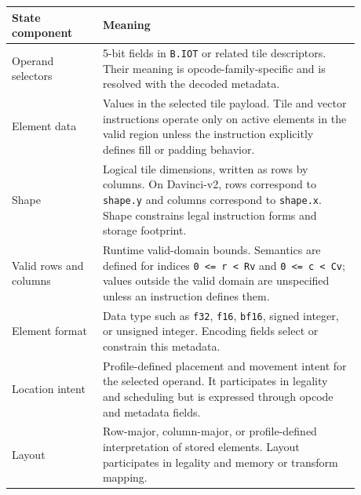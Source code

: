 \begin{longtable}{@{}L{0.23\linewidth}L{0.65\linewidth}@{}}
\toprule
State component & Meaning \\
\midrule
Operand selectors & 5-bit fields in \texttt{B.IOT} or related tile descriptors. Their meaning is opcode-family-specific and is resolved with the decoded metadata. \\
Element data & Values in the selected tile payload. Tile and vector instructions operate only on active elements in the valid region unless the instruction explicitly defines fill or padding behavior. \\
Shape & Logical tile dimensions, written as rows by columns. On Davinci-v2, rows correspond to \texttt{shape.y} and columns correspond to \texttt{shape.x}. Shape constrains legal instruction forms and storage footprint. \\
Valid rows and columns & Runtime valid-domain bounds. Semantics are defined for indices \texttt{0 <= r < Rv} and \texttt{0 <= c < Cv}; values outside the valid domain are unspecified unless an instruction defines them. \\
Element format & Data type such as \texttt{f32}, \texttt{f16}, \texttt{bf16}, signed integer, or unsigned integer. Encoding fields select or constrain this metadata. \\
Location intent & Profile-defined placement and movement intent for the selected operand. It participates in legality and scheduling but is expressed through opcode and metadata fields. \\
Layout & Row-major, column-major, or profile-defined interpretation of stored elements. Layout participates in legality and memory or transform mapping. \\
\bottomrule
\end{longtable}

